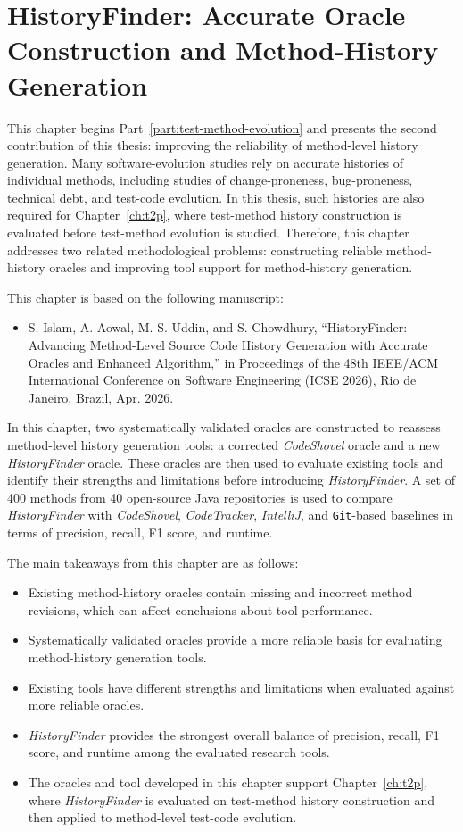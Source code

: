 \chapter{HistoryFinder: Accurate Oracle Construction and Method-History Generation}
\label{ch:hf}

This chapter begins Part~\ref{part:test-method-evolution} and presents the second contribution of this thesis: improving the reliability of method-level history generation. Many software-evolution studies rely on accurate histories of individual methods, including studies of change-proneness, bug-proneness, technical debt, and test-code evolution. In this thesis, such histories are also required for Chapter~\ref{ch:t2p}, where test-method history construction is evaluated before test-method evolution is studied. Therefore, this chapter addresses two related methodological problems: constructing reliable method-history oracles and improving tool support for method-history generation.

This chapter is based on the following manuscript:
\begin{itemize}
\item S. Islam, A. Aowal, M. S. Uddin, and S. Chowdhury, ``HistoryFinder: Advancing Method-Level Source Code History Generation with Accurate Oracles and Enhanced Algorithm,'' in Proceedings of the 48th IEEE/ACM International Conference on Software Engineering (ICSE 2026), Rio de Janeiro, Brazil, Apr. 2026.
\end{itemize}

In this chapter, two systematically validated oracles are constructed to reassess method-level history generation tools: a corrected \textit{CodeShovel} oracle and a new \textit{HistoryFinder} oracle. These oracles are then used to evaluate existing tools and identify their strengths and limitations before introducing \textit{HistoryFinder}. A set of 400 methods from 40 open-source Java repositories is used to compare \textit{HistoryFinder} with \textit{CodeShovel}, \textit{CodeTracker}, \textit{IntelliJ}, and \texttt{Git}-based baselines in terms of precision, recall, F1 score, and runtime.

The main takeaways from this chapter are as follows:
\begin{itemize}
\item Existing method-history oracles contain missing and incorrect method revisions, which can affect conclusions about tool performance.
\item Systematically validated oracles provide a more reliable basis for evaluating method-history generation tools.
\item Existing tools have different strengths and limitations when evaluated against more reliable oracles.
\item \textit{HistoryFinder} provides the strongest overall balance of precision, recall, F1 score, and runtime among the evaluated research tools.
\item The oracles and tool developed in this chapter support Chapter~\ref{ch:t2p}, where \textit{HistoryFinder} is evaluated on test-method history construction and then applied to method-level test-code evolution.
\end{itemize}

